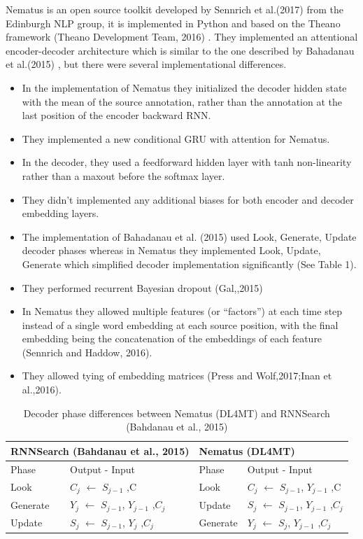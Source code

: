 Nematus is an open source toolkit developed by Sennrich et al.(2017) from the Edinburgh NLP group, it is implemented in Python and based on the Theano framework (Theano Development Team, 2016) . They implemented an attentional encoder-decoder architecture which is similar to the one described by Bahadanau et al.(2015) , but there were several implementational differences.
\begin{itemize}
\item In the implementation of Nematus they initialized the decoder hidden state with the mean of the source annotation, rather than the annotation at the last position of the encoder backward RNN. 
\item They implemented a new conditional GRU with attention for Nematus.
\item In the decoder, they used a feedforward hidden layer with tanh non-linearity rather than a maxout before the softmax layer.
\item They didn’t implemented any additional biases for both encoder and decoder embedding layers.
\item The implementation of Bahadanau et al. (2015) used Look, Generate, Update decoder phases whereas in Nematus they implemented Look, Update, Generate which simplified decoder implementation significantly (See Table 1). 
\item They performed recurrent Bayesian dropout (Gal,,2015)
\item In Nematus they allowed multiple features (or “factors”) at each time step instead of a single word embedding at each source position, with the final embedding being the concatenation of the embeddings of each feature (Sennrich and Haddow, 2016).
\item They allowed tying of embedding matrices (Press and Wolf,2017;Inan et al.,2016).
\end{itemize}

\begin{table}[h!]
\centering
 \begin{tabular}{ |ll|ll|} 
 \hline
 \multicolumn{2}{|l|}{RNNSearch (Bahdanau et al., 2015)} & \multicolumn{2}{l|}{Nematus (DL4MT)}\\
  \hline  Phase & Output - Input & Phase & Output - Input \\
  \hline Look & $C_j$ $\leftarrow$ $S_{j-1}$ ,C & Look & $C_j$ $\leftarrow$ $S_{j-1}$, $Y_{j-1}$ ,C \\
  Generate & $Y_j$ $\leftarrow$ $S_{j-1}$, $Y_{j-1}$ ,$C_j$ & Update& $S_j$ $\leftarrow$ $S_{j-1}$, $Y_{j-1}$ ,$C_j$ \\
  Update & $S_j$ $\leftarrow$ $S_{j-1}$, $Y_{j}$ ,$C_j$ & Generate& $Y_j$ $\leftarrow$ $S_{j}$, $Y_{j-1}$ ,$C_j$ \\
  \hline
 \end{tabular}

\caption{Decoder phase differences between Nematus (DL4MT) and RNNSearch (Bahdanau et al., 2015)}
\end{table}

